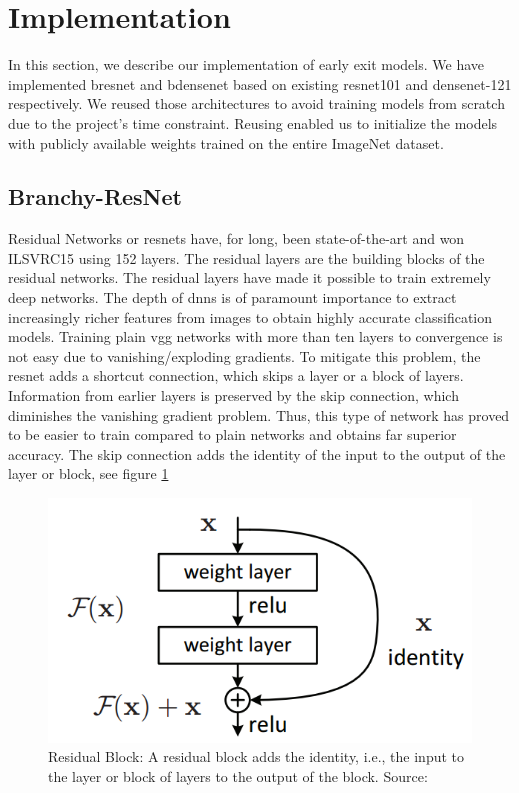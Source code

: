 \section{Implementation} \label{sec:ee-implementation}

In this section, we describe our implementation of early exit models. We have implemented \gls{bresnet} and \gls{bdensenet} based on existing \gls{resnet}101 and \gls{densenet}-121 respectively. We reused those architectures to avoid training models from scratch due to the project's time constraint. Reusing enabled us to initialize the models with publicly available weights trained on the entire ImageNet dataset.

\subsection{Branchy-ResNet} 

Residual Networks or \gls{resnet}s \cite{he_deep_2015} have, for long, been state-of-the-art and won ILSVRC15 using 152 layers. The residual layers are the building blocks of the residual networks. The residual layers have made it possible to train extremely deep networks. The depth of \gls{dnn}s is of paramount importance to extract increasingly richer features from images to obtain highly accurate classification models. Training plain \gls{vgg} networks \cite{simonyan_very_2015} with more than ten layers to convergence is not easy due to vanishing/exploding gradients. To mitigate this problem, the \gls{resnet} adds a shortcut connection, which skips a layer or a block of layers. Information from earlier layers is preserved by the skip connection, which diminishes the vanishing gradient problem. Thus, this type of network has proved to be easier to train compared to plain networks and obtains far superior accuracy. The skip connection adds the identity of the input to the output of the layer or block, see figure \ref{fig:residualblock}

\begin{figure}
	\centering
	\includegraphics[width=.5\linewidth]{figures/models/residualblock}
	\caption[Residual Block]{Residual Block: A residual block adds the identity, i.e., the input to the layer or block of layers to the output of the block. Source:  \cite{he_deep_2015}}
	\label{fig:residualblock}
\end{figure}

